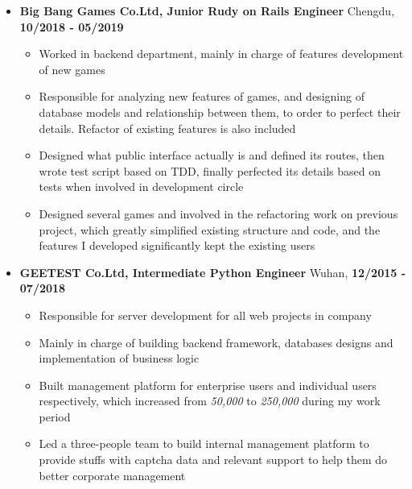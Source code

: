 \documentclass[12pt, a4paper,sans]{moderncv}     %
\begin{document}
\begin{itemize}

  \item{\textbf{Big Bang Games Co.Ltd, Junior Rudy on Rails Engineer} \hfill Chengdu, \textbf{10/2018 - 05/2019}}
  \vspace{2pt}
  \begin{itemize}
    \item {Worked in backend department, mainly in charge of features development of new games}
    \item {Responsible for analyzing new features of games, and designing of database models and relationship between them, to order to perfect their details. Refactor of existing features is also included}
    \item {Designed what public interface actually is and defined its routes, then wrote test script based on TDD, finally perfected its details based on tests when involved in development circle}
    \item {Designed several games and involved in the refactoring work on previous project, which greatly simplified existing structure and code, and the features I developed significantly kept the existing users}
  \end{itemize}

  \vspace{6pt}

  \item{\textbf{GEETEST Co.Ltd, Intermediate Python Engineer} \hfill Wuhan, \textbf{12/2015 - 07/2018}}

  \begin{itemize}
    \item {Responsible for server development for all web projects in company}
    \item {Mainly in charge of building backend framework, databases designs and implementation of business logic}
    \item {Built management platform for enterprise users and individual users respectively, which increased from \textit{50,000} to \textit{250,000} during my work period}
    \item {Led a three-people team to build internal management platform to provide stuffs with captcha data and relevant support to help them do better corporate management}
  \end{itemize}

\end{itemize}
\end{document}
